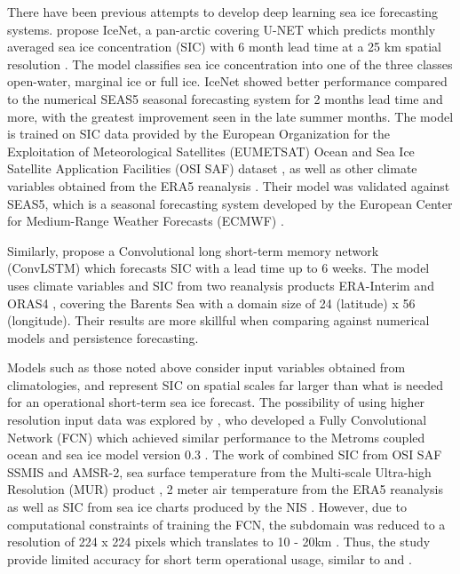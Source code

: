 \documentclass[../main/thesis.tex]{subfiles}
\begin{document}
There have been previous attempts to develop deep learning sea ice forecasting systems. \citet{Andersson2021} propose IceNet, a pan-arctic covering U-NET which predicts monthly averaged sea ice concentration (SIC) with 6 month lead time at a 25 km spatial resolution \citep{Andersson2021}. The model classifies sea ice concentration into one of the three classes open-water, marginal ice or full ice. IceNet showed better performance compared to the numerical SEAS5 seasonal forecasting system \citep{Johnson2019} for 2 months lead time and more, with the greatest improvement seen in the late summer months. The model is trained on SIC data provided by the European Organization for the Exploitation of Meteorological Satellites (EUMETSAT) Ocean and Sea Ice Satellite Application Facilities (OSI SAF) dataset \citep{Lavergne2019}, as well as other climate variables obtained from the ERA5 reanalysis \citep{Hersbach2020}. Their model was validated against SEAS5, which is a seasonal forecasting system developed by the European Center for Medium-Range Weather Forecasts (ECMWF) \citep{Johnson2019}.

Similarly, \citet{Liu2021} propose a Convolutional long short-term memory network (ConvLSTM) which forecasts SIC with a lead time up to 6 weeks. The model uses climate variables and SIC from two reanalysis products ERA-Interim \citep{Dee2011} and ORAS4 \citep{Balmaseda2013}, covering the Barents Sea with a domain size of 24 (latitude) x 56 (longitude). Their results are more skillful when comparing against numerical models and persistence forecasting. 

Models such as those noted above consider input variables obtained from climatologies, and represent SIC on spatial scales far larger than what is needed for an operational short-term sea ice forecast. The possibility of using higher resolution input data was explored by \citet{Fritzner2020}, who developed a Fully Convolutional Network (FCN) which achieved similar performance to the Metroms coupled ocean and sea ice model version 0.3 \citep{Kristensen2017}. The work of \citet{Fritzner2020} combined SIC from OSI SAF SSMIS and AMSR-2, sea surface temperature from the Multi-scale Ultra-high Resolution (MUR) product \citep{Chin2017}, 2 meter air temperature from the ERA5 reanalysis \citep{Hersbach2020} as well as SIC from sea ice charts produced by the NIS \citep{Dinessen2020}. However, due to computational constraints of training the FCN, the subdomain was reduced to a resolution of 224 x 224 pixels which translates to 10 - 20km \citep{Fritzner2020}. Thus, the study provide limited accuracy for short term operational usage, similar to \citet{Andersson2021} and \citet{Liu2021}.
\end{document}
